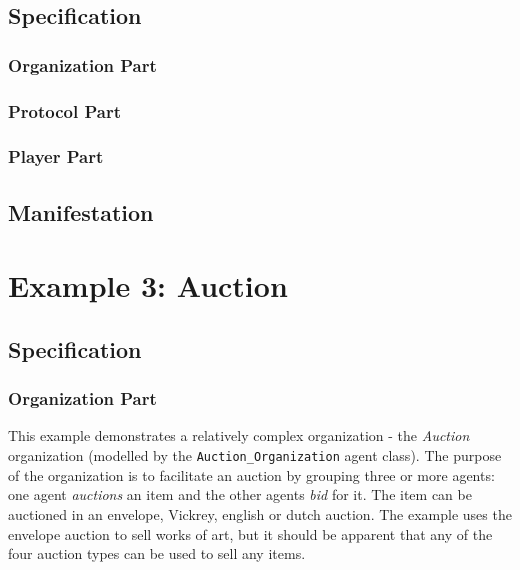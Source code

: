 \subsection*{Specification}

\subsubsection*{Organization Part}

\subsubsection*{Protocol Part}

\subsubsection*{Player Part}

\subsection*{Manifestation}

\section{Example 3: Auction}

\subsection*{Specification}

\subsubsection*{Organization Part}

This example demonstrates a relatively complex organization - the \textit{Auction} organization (modelled by the \texttt{Auction\_Organization} agent class).
The purpose of the organization is to facilitate an auction by grouping three or more agents: one agent \textit{auctions} an item and the other agents \textit{bid} for it.
The item can be auctioned in an envelope, Vickrey, english or dutch auction.
The example uses the envelope auction to sell works of art, but it should be apparent that any of the four auction types can be used to sell any items.

